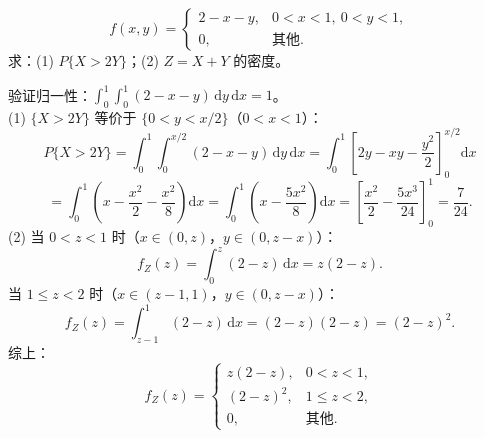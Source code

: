\documentclass[lang=cn,11pt]{elegantbook}
\begin{document}
\begin{exercise}[三角形均匀分布求概率与卷积] \label{exer:3-c14}
\[f(x,y) = \begin{cases} 2-x-y, & 0 < x < 1,\ 0 < y < 1, \\ 0, & \text{其他}. \end{cases}\]
求：(1) $P\{X > 2Y\}$；(2) $Z = X+Y$ 的密度。
\end{exercise}
\begin{solution}
验证归一性：$\int_0^1\int_0^1(2-x-y)\,\mathrm{d}y\,\mathrm{d}x = 1$。\\
(1) $\{X > 2Y\}$ 等价于 $\{0 < y < x/2\}$（$0 < x < 1$）：
\[
P\{X > 2Y\} = \int_0^1\int_0^{x/2}(2-x-y)\,\mathrm{d}y\,\mathrm{d}x = \int_0^1\left[2y-xy-\frac{y^2}{2}\right]_0^{x/2}\mathrm{d}x
\]
\[
= \int_0^1\left(x - \frac{x^2}{2} - \frac{x^2}{8}\right)\mathrm{d}x = \int_0^1\left(x - \frac{5x^2}{8}\right)\mathrm{d}x = \left[\frac{x^2}{2} - \frac{5x^3}{24}\right]_0^1 = \frac{7}{24}.
\]
(2) 当 $0 < z < 1$ 时（$x \in (0,z)$，$y \in (0, z-x)$）：
\[
f_Z(z) = \int_0^z(2-z)\,\mathrm{d}x = z(2-z).
\]
当 $1 \leqslant z < 2$ 时（$x \in (z-1, 1)$，$y \in (0, z-x)$）：
\[
f_Z(z) = \int_{z-1}^1(2-z)\,\mathrm{d}x = (2-z)(2-z) = (2-z)^2.
\]
综上：
\[
f_Z(z) = \begin{cases} z(2-z), & 0 < z < 1, \\ (2-z)^2, & 1 \leqslant z < 2, \\ 0, & \text{其他}. \end{cases}
\]
\end{solution}
\end{document}
